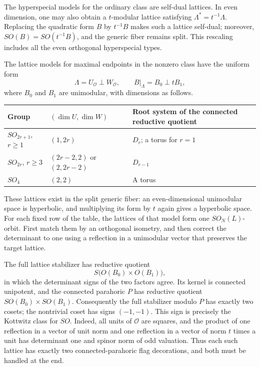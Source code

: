 \documentclass[11pt,a4paper]{article}
\theoremstyle{definition}
\theoremstyle{remark}
\begin{document}
The hyperspecial models for the ordinary class are self-dual lattices.
In even dimension, one may also obtain a \(t\)-modular lattice satisfying
\(\Lambda^*=t^{-1}\Lambda\). Replacing the quadratic form \(B\) by
\(t^{-1}B\) makes such a lattice self-dual; moreover,
\(SO(B)=SO(t^{-1}B)\), and the generic fiber remains split. This
rescaling includes all the even orthogonal hyperspecial types.

The lattice models for maximal endpoints in the nonzero class have the
uniform form
\[
 \Lambda=U_{\mathcal O}\perp W_{\mathcal O},\qquad
 B|_\Lambda=B_0\perp tB_1,
\]
where \(B_0\) and \(B_1\) are unimodular, with dimensions as follows.

\begin{center}
\begin{tabularx}{\textwidth}{@{}l l X@{}}
\toprule
Group & \((\dim U,\dim W)\) &
Root system of the connected reductive quotient\\
\midrule
\(SO_{2r+1}\), \(r\geq1\) &
\((1,2r)\) &
\(D_r\); a torus for \(r=1\)\\
\(SO_{2r}\), \(r\geq3\) &
\((2r-2,2)\) or \((2,2r-2)\) &
\(D_{r-1}\)\\
\(SO_4\) & \((2,2)\) & A torus\\
\bottomrule
\end{tabularx}
\end{center}

These lattices exist in the split generic fiber: an even-dimensional
unimodular space is hyperbolic, and multiplying its form by \(t\) again
gives a hyperbolic space. For each fixed row of the table, the lattices
of that model form one \(SO_N(L)\)-orbit. First match them by an
orthogonal isometry, and then correct the determinant to one using a
reflection in a unimodular vector that preserves the target lattice.

The full lattice stabilizer has reductive quotient
\[
 S\bigl(O(B_0)\times O(B_1)\bigr),
\]
in which the determinant signs of the two factors agree. Its kernel
is connected unipotent, and the connected parahoric \(P\) has reductive
quotient \(SO(B_0)\times SO(B_1)\). Consequently the full stabilizer
modulo \(P\) has exactly two cosets; the nontrivial coset has signs
\((-1,-1)\). This sign is precisely the Kottwitz class for \(SO\).
Indeed, all units of \(\mathcal O\) are squares, and the product of
one reflection in a vector of unit norm and one reflection in a vector
of norm \(t\) times a unit has determinant one and spinor norm of odd
valuation. Thus each such lattice has exactly two connected-parahoric
flag decorations, and both must be handled at the end.
\end{document}
